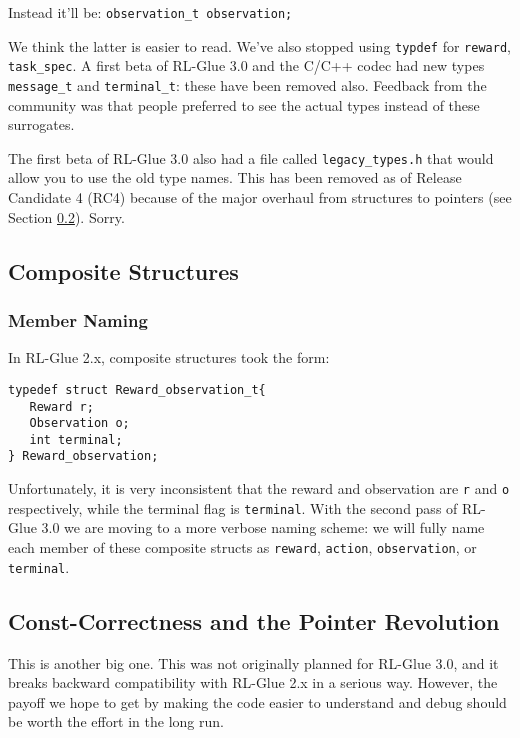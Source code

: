 \documentclass[11pt]{article}
\begin{document}
Instead it'll be:\newline
\texttt{observation\_t observation;}

We think the latter is easier to read.  We've also stopped using \texttt{typdef} for \texttt{reward}, \texttt{task\_spec}.  A first beta of RL-Glue 3.0 and the C/C++ codec had new types \texttt{message\_t} and \texttt{terminal\_t}: these have been removed also.  Feedback from the community was that people preferred to see the actual types instead of these surrogates.

The first beta of RL-Glue 3.0 also had a file called \texttt{legacy\_types.h} that would allow you to use the old type names.  This has been removed as of Release Candidate 4 (RC4) because of the major overhaul from structures to pointers (see Section \ref{pointers}). Sorry. 

\subsection{Composite Structures}

\subsubsection{Member Naming}
In RL-Glue 2.x, composite structures took the form:
\begin{verbatim}
typedef struct Reward_observation_t{
   Reward r;
   Observation o;
   int terminal;
} Reward_observation;
\end{verbatim}

Unfortunately, it is very inconsistent that the reward and observation are \texttt{r} and \texttt{o} respectively, 
while the terminal flag is \texttt{terminal}.  With the second pass of RL-Glue 3.0 we are moving to a more verbose 
naming scheme: we will fully name each member of these composite structs as \texttt{reward}, \texttt{action}, 
\texttt{observation}, or \texttt{terminal}.




\subsection{Const-Correctness and the Pointer Revolution}
\label{pointers}
This is another big one.  This was not originally planned for RL-Glue 3.0, and it breaks backward compatibility with RL-Glue
2.x in a serious way.  However, the payoff we hope to get by making the code easier to understand and debug should be 
worth the effort in the long run.
\end{document}

